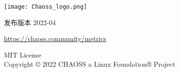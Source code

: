 \begin{titlepage}
    \begin{center}
        \vspace*{1.5cm}
            
        \texttt{[image: Chaoss\_logo.png]}
        
	\vspace{2cm}


        \vspace{1cm}
        \Huge
        发布版本 2022-04
            
        \vspace{1.5cm}
        
	\LARGE
	    \url{https://chaoss.community/metrics}
            
        \vfill
            
        \Large
        MIT License\\
        Copyright © 2022 CHAOSS a Linux Foundation® Project\\
            
    \end{center}
\end{titlepage}

\thispagestyle{empty}
